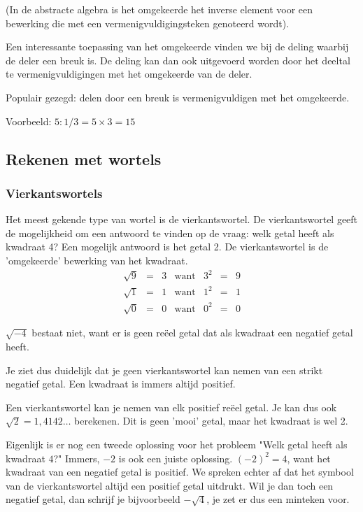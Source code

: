 \noindent (In de abstracte algebra is het omgekeerde het inverse element
voor een bewerking die met een vermenigvuldigingsteken genoteerd wordt).

\medskip{}


\noindent Een interessante toepassing van het omgekeerde vinden we
bij de deling waarbij de deler een breuk is. De deling kan dan ook
uitgevoerd worden door het deeltal te vermenigvuldigingen met het
omgekeerde van de deler. 

\noindent Populair gezegd: delen door een breuk is vermenigvuldigen
met het omgekeerde.

\noindent Voorbeeld: $5:1/3=5\times3=15$ 


\subsection{Rekenen met wortels}
\subsubsection{Vierkantswortels}


Het meest gekende type van wortel is de vierkantswortel. De vierkantswortel geeft de mogelijkheid om een antwoord te vinden op de vraag: welk getal heeft als kwadraat 4? Een mogelijk antwoord is het getal 2. De vierkantswortel is de 'omgekeerde' bewerking van het kwadraat.
\begin{equation*}
\begin{array}{ccccccc}
\sqrt{9} &=& 3 & \text{want} & 3^2 &=& 9 \\
\sqrt{1} &=& 1 & \text{want} & 1^2 &=& 1 \\
\sqrt{0} &=& 0 & \text{want} & 0^2 &=& 0 
\end{array}
\end{equation*}

$\sqrt{-4}$ bestaat niet, want er is geen re\"eel getal dat als kwadraat een negatief getal heeft.

Je ziet dus duidelijk dat je geen vierkantswortel kan nemen van een strikt negatief getal. Een kwadraat is immers altijd positief.

Een vierkantswortel kan je nemen van elk positief re\"eel getal. Je kan dus ook $\sqrt{2}=1,4142\ldots$ berekenen. 
Dit is geen 'mooi' getal, maar het kwadraat is wel 2.

Eigenlijk is er nog een tweede oplossing voor het probleem "Welk getal heeft als kwadraat $4$?"
Immers, $-2$ is ook een juiste oplossing. $(-2)^2=4$, want het kwadraat van een negatief getal is positief. We spreken echter af dat het symbool van de vierkantswortel altijd een positief getal uitdrukt. Wil je dan toch een negatief getal, dan schrijf je bijvoorbeeld $-\sqrt{4}$, je zet er dus een minteken voor.



